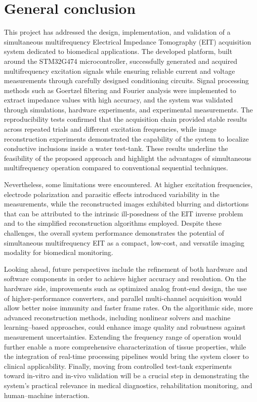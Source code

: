\chapter*{General conclusion }

This project has addressed the design, implementation, and validation of a simultaneous multifrequency Electrical Impedance Tomography (EIT) acquisition system dedicated to biomedical applications. The developed platform, built around the STM32G474 microcontroller, successfully generated and acquired multifrequency excitation signals while ensuring reliable current and voltage measurements through carefully designed conditioning circuits. Signal processing methods such as Goertzel filtering and Fourier analysis were implemented to extract impedance values with high accuracy, and the system was validated through simulations, hardware experiments, and experimental measurements. The reproducibility tests confirmed that the acquisition chain provided stable results across repeated trials and different excitation frequencies, while image reconstruction experiments demonstrated the capability of the system to localize conductive inclusions inside a water test-tank. These results underline the feasibility of the proposed approach and highlight the advantages of simultaneous multifrequency operation compared to conventional sequential techniques.

Nevertheless, some limitations were encountered. At higher excitation frequencies, electrode polarization and parasitic effects introduced variability in the measurements, while the reconstructed images exhibited blurring and distortions that can be attributed to the intrinsic ill-posedness of the EIT inverse problem and to the simplified reconstruction algorithms employed. Despite these challenges, the overall system performance demonstrates the potential of simultaneous multifrequency EIT as a compact, low-cost, and versatile imaging modality for biomedical monitoring.

Looking ahead, future perspectives include the refinement of both hardware and software components in order to achieve higher accuracy and resolution. On the hardware side, improvements such as optimized analog front-end design, the use of higher-performance converters, and parallel multi-channel acquisition would allow better noise immunity and faster frame rates. On the algorithmic side, more advanced reconstruction methods, including nonlinear solvers and machine learning–based approaches, could enhance image quality and robustness against measurement uncertainties. Extending the frequency range of operation would further enable a more comprehensive characterization of tissue properties, while the integration of real-time processing pipelines would bring the system closer to clinical applicability. Finally, moving from controlled test-tank experiments toward in-vitro and in-vivo validation will be a crucial step in demonstrating the system’s practical relevance in medical diagnostics, rehabilitation monitoring, and human–machine interaction.

